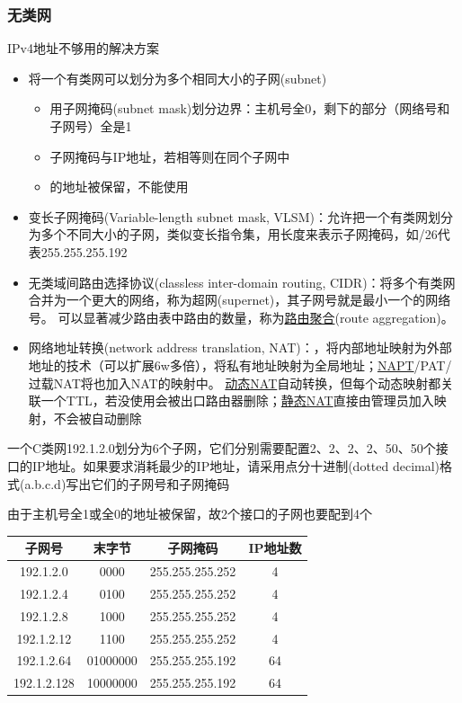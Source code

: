 \subsubsection{无类网}
IPv4地址不够用的解决方案
\begin{itemize}
	\item 将一个有类网可以划分为多个相同大小的子网(subnet)
	\begin{itemize}
		\item 用子网掩码(subnet mask)划分边界：主机号全0，剩下的部分（网络号和子网号）全是1
		\item 子网掩码与IP地址，若相等则在同个子网中
		\item {}的地址被保留，不能使用
	\end{itemize}
	\item 变长子网掩码(Variable-length subnet mask, VLSM)：允许把一个有类网划分为多个不同大小的子网，类似变长指令集，用长度来表示子网掩码，如/26代表255.255.255.192
	\item 无类域间路由选择协议(classless inter-domain routing, CIDR)：将多个有类网合并为一个更大的网络，称为超网(supernet)，其子网号就是最小一个的网络号。
	可以显著减少路由表中路由的数量，称为\underline{路由聚合}(route aggregation)。
	\item 网络地址转换(network address translation, NAT)：，将内部地址映射为外部地址的技术（可以扩展6w多倍），将私有地址映射为全局地址；\underline{NAPT}/PAT/过载NAT将也加入NAT的映射中。
	\underline{动态NAT}自动转换，但每个动态映射都关联一个TTL，若没使用会被出口路由器删除；\underline{静态NAT}直接由管理员加入映射，不会被自动删除
\end{itemize}
\begin{example}
	一个C类网192.1.2.0划分为6个子网，它们分别需要配置2、2、2、2、50、50个接口的IP地址。如果要求消耗最少的IP地址，请采用点分十进制(dotted decimal)格式(a.b.c.d)写出它们的子网号和子网掩码
\end{example}
\begin{analysis}
	由于主机号全1或全0的地址被保留，故2个接口的子网也要配到4个
	\begin{center}
		\begin{tabular}{cccc}\hline
			子网号 & 末字节 & 子网掩码 & IP地址数\\\hline
			192.1.2.0 & 0000 & 255.255.255.252 & 4\\
			192.1.2.4 & 0100 & 255.255.255.252 & 4\\
			192.1.2.8 & 1000 & 255.255.255.252 & 4\\
			192.1.2.12 & 1100 & 255.255.255.252 & 4\\
			192.1.2.64 & 01000000 & 255.255.255.192 & 64\\
			192.1.2.128 & 10000000 & 255.255.255.192 & 64\\\hline
		\end{tabular}
	\end{center}
\end{analysis}

